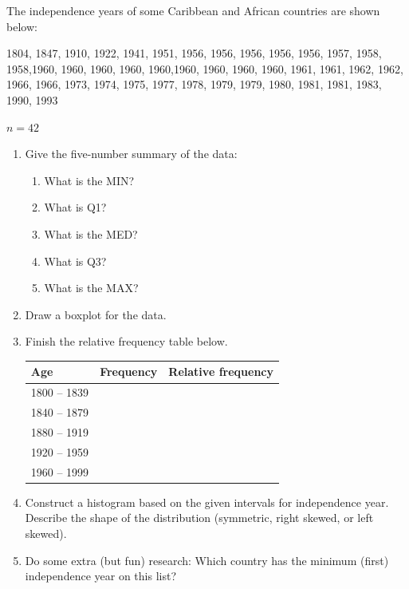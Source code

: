 \documentclass[11pt, chapterprefix=true]{scrbook}\usepackage[]{graphicx}\usepackage[]{color}
\begin{document}
\begin{exercises}
\begin{exercise}
The independence years of some Caribbean and African countries are shown below:
                
1804, 1847, 1910, 1922, 1941, 1951, 1956, 1956, 1956, 1956, 1956, 1957, 1958, 1958,1960, 1960, 1960, 1960, 1960,1960, 1960, 1960, 1960, 1961, 1961, 1962, 1962, 1966, 1966, 1973, 1974, 1975, 1977, 1978, 1979, 1979, 1980, 1981, 1981, 1983, 1990, 1993

$n = 42$

\begin{enumerate}
  \item Give the five-number summary of the data:
  {\small{
  \begin{enumerate}
  \item What is the MIN?
  \item What is Q1?
  \item What is the MED?
  \item What is Q3?
  \item What is the MAX?
\end{enumerate}
}}
\item Draw a boxplot for the data.
\item Finish the relative frequency table below.

{\small{
\begin{tabular}{@{} lcc @{}} \hline
Age & Frequency & Relative frequency \\ \hline 
1800 – 1839 & & \\
1840 – 1879 & & \\		
1880 – 1919	& & \\						
1920 – 1959	& & \\				
1960 – 1999	& & \\
\end{tabular}
}}
\item	Construct a histogram based on the given intervals for independence year. Describe the shape of the distribution (symmetric, right skewed, or left skewed).
\item Do some extra (but fun) research: Which country has the minimum (first) independence year on this list?
\end{enumerate}
\end{exercise} 
\begin{solution}  %

\end{solution}

\clearpage

    \begin{exercise}  %


\end{exercise}
\end{exercises}
\end{document}
